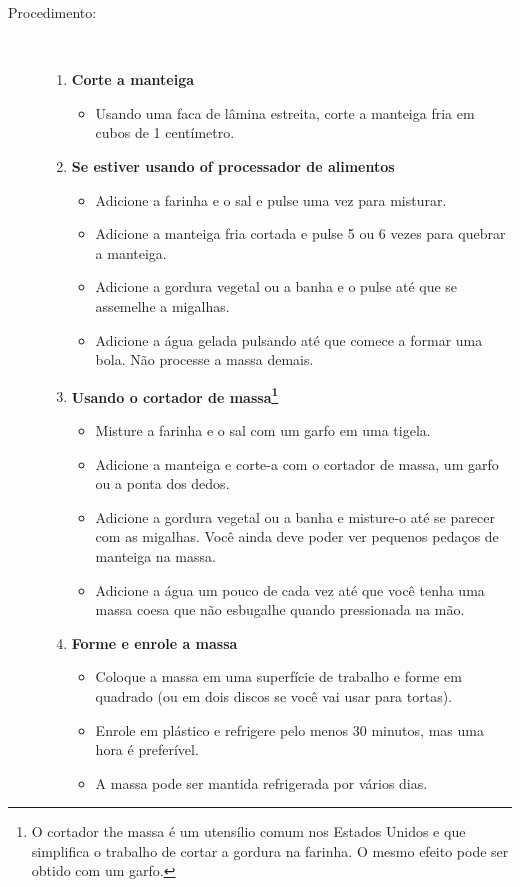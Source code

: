 \documentclass [11pt, letterpaper] {article}
\begin{document}
\begin {description}
\item [Procedimento:] \ \\
\begin {enumerate}
\item {\bf Corte a manteiga}
\begin {itemize}
\item Usando uma faca de l\^amina estreita, corte a manteiga fria em cubos de 1 cent\'imetro.
\end {itemize}
\item {\bf Se estiver usando of processador de alimentos}
\begin {itemize}
\item Adicione a farinha e o sal e pulse uma vez para misturar.
\item Adicione a manteiga fria cortada e pulse 5 ou 6 vezes para quebrar a manteiga.
\item Adicione a gordura vegetal ou a banha e o pulse até que se assemelhe a migalhas.
\item Adicione a água gelada pulsando até que comece a formar uma bola.  Não processe a massa demais.
\end {itemize}
\item {\bf Usando o cortador de massa\footnote{O cortador the massa \'e um utens\'ilio comum nos Estados Unidos e que simplifica o trabalho de cortar a gordura na farinha. O mesmo efeito pode ser obtido com um garfo.}}
\begin {itemize}
\item Misture a farinha e o sal com um garfo em uma tigela.
\item Adicione a manteiga e corte-a com o cortador de massa, um garfo ou a ponta dos dedos.
\item Adicione a gordura vegetal ou a banha e misture-o até se parecer com as migalhas. Voc\^e ainda deve poder ver pequenos pedaços de manteiga na massa.
\item Adicione a água um pouco de cada vez até que você tenha uma massa coesa que n\~ao esbugalhe quando pressionada na mão.
\end {itemize}
\item {\bf Forme e enrole a massa}
\begin {itemize}
\item Coloque a massa em uma superfície de trabalho e forme em quadrado (ou em dois discos se você vai usar para tortas).
\item Enrole em plástico e refrigere pelo menos 30 minutos, mas uma hora é preferível.
\item A massa pode ser mantida refrigerada por vários dias.
\end {itemize}
\end {enumerate}
\end {description}
\end{document}
